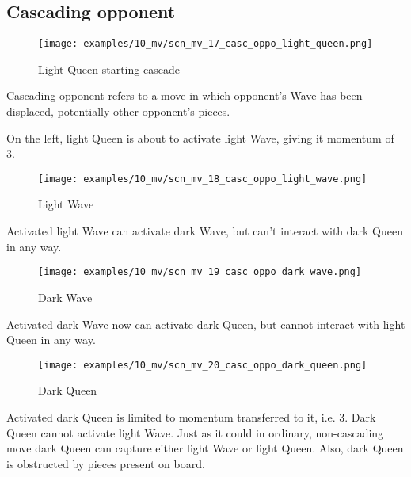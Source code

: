 \subsection*{Cascading opponent}

\noindent
\begin{wrapfigure}[10]{l}{0.5625\textwidth}
\centering
\texttt{[image: examples/10\_mv/scn\_mv\_17\_casc\_oppo\_light\_queen.png]}
\caption{Light Queen starting cascade}
\label{fig:scn_mv_17_casc_oppo_light_queen}
\end{wrapfigure}
Cascading opponent refers to a move in which opponent's Wave has been displaced,
potentially other opponent's pieces.

On the left, light Queen is about to activate light Wave, giving it momentum of 3.

\vspace*{0.155\textheight}
\noindent
\begin{wrapfigure}[5]{r}{0.5625\textwidth}
\centering
\texttt{[image: examples/10\_mv/scn\_mv\_18\_casc\_oppo\_light\_wave.png]}
\caption{Light Wave}
\label{fig:scn_mv_18_casc_oppo_light_wave}
\end{wrapfigure}
Activated light Wave can activate dark Wave, but can't interact with dark Queen in
any way.

\clearpage %

\noindent
\begin{wrapfigure}[5]{l}{0.5625\textwidth}
\centering
\texttt{[image: examples/10\_mv/scn\_mv\_19\_casc\_oppo\_dark\_wave.png]}
\caption{Dark Wave}
\label{fig:scn_mv_19_casc_oppo_dark_wave}
\end{wrapfigure}
Activated dark Wave now can activate dark Queen, but cannot interact with light Queen
in any way.

\vspace*{0.315\textheight}
\noindent
\begin{wrapfigure}[13]{r}{0.5625\textwidth}
\centering
\texttt{[image: examples/10\_mv/scn\_mv\_20\_casc\_oppo\_dark\_queen.png]}
\caption{Dark Queen}
\label{fig:scn_mv_20_casc_oppo_dark_queen}
\end{wrapfigure}
Activated dark Queen is limited to momentum transferred to it, i.e. 3. Dark Queen
cannot activate light Wave. Just as it could in ordinary, non-cascading move dark
Queen can capture either light Wave or light Queen. Also, dark Queen is obstructed
by pieces present on board.

